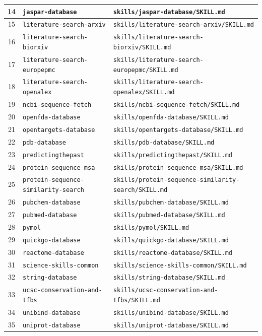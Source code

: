 \begin{longtable}{|c|p{}|p{}|}
14 & \texttt{jaspar-database} & \texttt{skills/jaspar-database/SKILL.md} \\ \hline
15 & \texttt{literature-search-arxiv} & \texttt{skills/literature-search-arxiv/SKILL.md} \\ \hline
16 & \texttt{literature-search-biorxiv} & \texttt{skills/literature-search-biorxiv/SKILL.md} \\ \hline
17 & \texttt{literature-search-europepmc} & \texttt{skills/literature-search-europepmc/SKILL.md} \\ \hline
18 & \texttt{literature-search-openalex} & \texttt{skills/literature-search-openalex/SKILL.md} \\ \hline
19 & \texttt{ncbi-sequence-fetch} & \texttt{skills/ncbi-sequence-fetch/SKILL.md} \\ \hline
20 & \texttt{openfda-database} & \texttt{skills/openfda-database/SKILL.md} \\ \hline
21 & \texttt{opentargets-database} & \texttt{skills/opentargets-database/SKILL.md} \\ \hline
22 & \texttt{pdb-database} & \texttt{skills/pdb-database/SKILL.md} \\ \hline
23 & \texttt{predictingthepast} & \texttt{skills/predictingthepast/SKILL.md} \\ \hline
24 & \texttt{protein-sequence-msa} & \texttt{skills/protein-sequence-msa/SKILL.md} \\ \hline
25 & \texttt{protein-sequence-similarity-search} & \texttt{skills/protein-sequence-similarity-search/SKILL.md} \\ \hline
26 & \texttt{pubchem-database} & \texttt{skills/pubchem-database/SKILL.md} \\ \hline
27 & \texttt{pubmed-database} & \texttt{skills/pubmed-database/SKILL.md} \\ \hline
28 & \texttt{pymol} & \texttt{skills/pymol/SKILL.md} \\ \hline
29 & \texttt{quickgo-database} & \texttt{skills/quickgo-database/SKILL.md} \\ \hline
30 & \texttt{reactome-database} & \texttt{skills/reactome-database/SKILL.md} \\ \hline
31 & \texttt{science-skills-common} & \texttt{skills/science-skills-common/SKILL.md} \\ \hline
32 & \texttt{string-database} & \texttt{skills/string-database/SKILL.md} \\ \hline
33 & \texttt{ucsc-conservation-and-tfbs} & \texttt{skills/ucsc-conservation-and-tfbs/SKILL.md} \\ \hline
34 & \texttt{unibind-database} & \texttt{skills/unibind-database/SKILL.md} \\ \hline
35 & \texttt{uniprot-database} & \texttt{skills/uniprot-database/SKILL.md} \\ \hline
\end{longtable}
\normalsize
